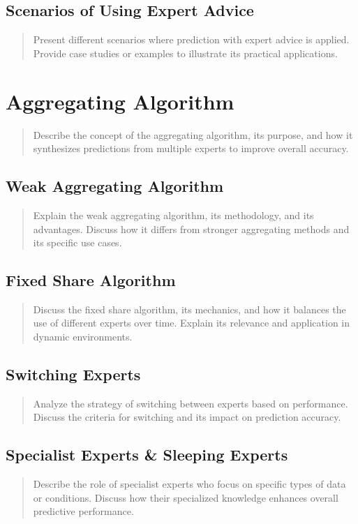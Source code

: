 \documentclass[11pt]{article} %
\theoremstyle{plain}
\theoremstyle{definition}
\begin{document}
\subsection{Scenarios of Using Expert Advice}
\begin{quote}
  Present different scenarios where prediction with expert advice is applied. Provide case studies or examples to illustrate its practical applications.
\end{quote}

\newpage

\section{Aggregating Algorithm}
\begin{quote}
  Describe the concept of the aggregating algorithm, its purpose, and how it synthesizes predictions from multiple experts to improve overall accuracy.
\end{quote}

\subsection{Weak Aggregating Algorithm}
\begin{quote}
  Explain the weak aggregating algorithm, its methodology, and its advantages. Discuss how it differs from stronger aggregating methods and its specific use cases.
\end{quote}

\subsection{Fixed Share Algorithm}
\begin{quote}
  Discuss the fixed share algorithm, its mechanics, and how it balances the use of different experts over time. Explain its relevance and application in dynamic environments.
\end{quote}

\subsection{Switching Experts}
\begin{quote}
  Analyze the strategy of switching between experts based on performance. Discuss the criteria for switching and its impact on prediction accuracy.
\end{quote}

\subsection{Specialist Experts \& Sleeping Experts}
\begin{quote}
  Describe the role of specialist experts who focus on specific types of data or conditions. Discuss how their specialized knowledge enhances overall predictive performance.
\end{quote}
\end{document}
